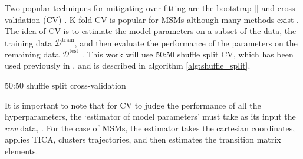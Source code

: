 Two popular techniques for mitigating over-fitting are the bootstrap [] and cross-validation (CV) \cite{friedman2001elements}. K-fold CV is popular for MSMs \cite{schererVariationalSelectionFeatures2019}\cite{mcgibbonVariationalCrossvalidationSlow2015} although many methods exist \cite{arlotSurveyCrossvalidationProcedures2009}. The idea of CV is to estimate the model parameters on a subset of the data, the training data $\mathcal{D}^{\mathrm{train}}$, and then evaluate the performance of the parameters on the remaining data $\mathcal{D}^{\mathrm{test}}$ \cite{friedman2001elements}. This work will use 50:50 shuffle split CV, which has been used previously in  \cite{chenDynamicConformationalLandscape2019}\cite{husicOptimizedParameterSelection2016}, and is described in algorithm \ref{alg:shuffle_split}. 

\begin{algorithm}\label{alg:shuffle_split}
\BlankLine
{}
\caption{50:50 shuffle split cross-validation}
\end{algorithm}
It is important to note that for CV to judge the performance of all the hyperparameters, the `estimator of model parameters' must take as its input the \emph{raw} data, \cite{friedman2001elements}. For the case of MSMs, the estimator takes the cartesian coordinates, applies TICA, clusters trajectories, and then estimates the transition matrix elements.  

